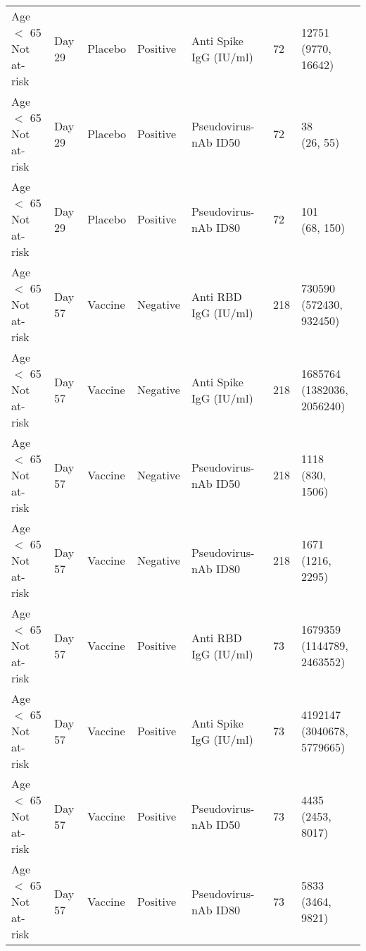 \documentclass[]{book}
\theoremstyle{definition}
\theoremstyle{definition}
\theoremstyle{definition}
\newcommand{\1}{\mathbbm{1}}
\begin{document}
\begin{landscape}
\begin{ThreePartTable}
\begin{longtable}[t]{>{\raggedright\arraybackslash}p{7cm}llllll}
\hspace{1em}Age $<$ 65 Not at-risk & Day 29 & Placebo & Positive & Anti Spike IgG (IU/ml) & 72 & \makecell[l]{12751\\(9770, 16642)}\\
\hspace{1em}Age $<$ 65 Not at-risk & Day 29 & Placebo & Positive & Pseudovirus-nAb ID50 & 72 & \makecell[l]{38\\(26, 55)}\\
\hspace{1em}Age $<$ 65 Not at-risk & Day 29 & Placebo & Positive & Pseudovirus-nAb ID80 & 72 & \makecell[l]{101\\(68, 150)}\\
\hspace{1em}Age $<$ 65 Not at-risk & Day 57 & Vaccine & Negative & Anti RBD IgG (IU/ml) & 218 & \makecell[l]{730590\\(572430, 932450)}\\
\hspace{1em}Age $<$ 65 Not at-risk & Day 57 & Vaccine & Negative & Anti Spike IgG (IU/ml) & 218 & \makecell[l]{1685764\\(1382036, 2056240)}\\
\hspace{1em}Age $<$ 65 Not at-risk & Day 57 & Vaccine & Negative & Pseudovirus-nAb ID50 & 218 & \makecell[l]{1118\\(830, 1506)}\\
\hspace{1em}Age $<$ 65 Not at-risk & Day 57 & Vaccine & Negative & Pseudovirus-nAb ID80 & 218 & \makecell[l]{1671\\(1216, 2295)}\\
\hspace{1em}Age $<$ 65 Not at-risk & Day 57 & Vaccine & Positive & Anti RBD IgG (IU/ml) & 73 & \makecell[l]{1679359\\(1144789, 2463552)}\\
\hspace{1em}Age $<$ 65 Not at-risk & Day 57 & Vaccine & Positive & Anti Spike IgG (IU/ml) & 73 & \makecell[l]{4192147\\(3040678, 5779665)}\\
\hspace{1em}Age $<$ 65 Not at-risk & Day 57 & Vaccine & Positive & Pseudovirus-nAb ID50 & 73 & \makecell[l]{4435\\(2453, 8017)}\\
\hspace{1em}Age $<$ 65 Not at-risk & Day 57 & Vaccine & Positive & Pseudovirus-nAb ID80 & 73 & \makecell[l]{5833\\(3464, 9821)}\\

\end{longtable}
\end{ThreePartTable}
\end{landscape}
\end{document}
